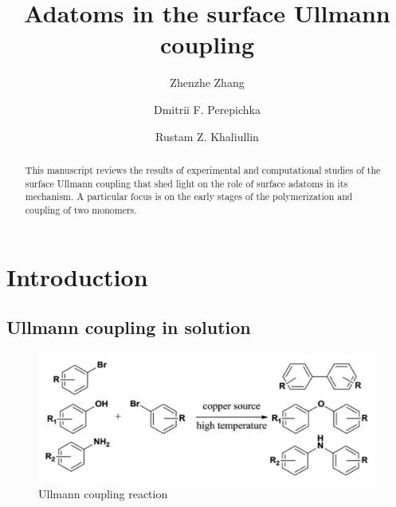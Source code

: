 \documentclass[aps,reprint,amsmath,amssymb]{revtex4-2}
\begin{document}
\title{Adatoms in the surface Ullmann coupling}

\author{Zhenzhe Zhang}
\author{Dmitrii F. Perepichka}
\author{Rustam Z. Khaliullin}

\begin{abstract}
This manuscript reviews the results of experimental and computational studies of the surface Ullmann coupling that shed light on the role of surface adatoms in its mechanism. A particular focus is on the early stages of the polymerization and coupling of two monomers.
\end{abstract}

\maketitle



\section{Introduction}

\subsection{Ullmann coupling in solution}

\begin{figure}[b]
\centering
\includegraphics[width=0.98\columnwidth]{Fig/classical.png}
\caption{Ullmann coupling reaction}
\label{fig:initial}
\end{figure}
\end{document}
